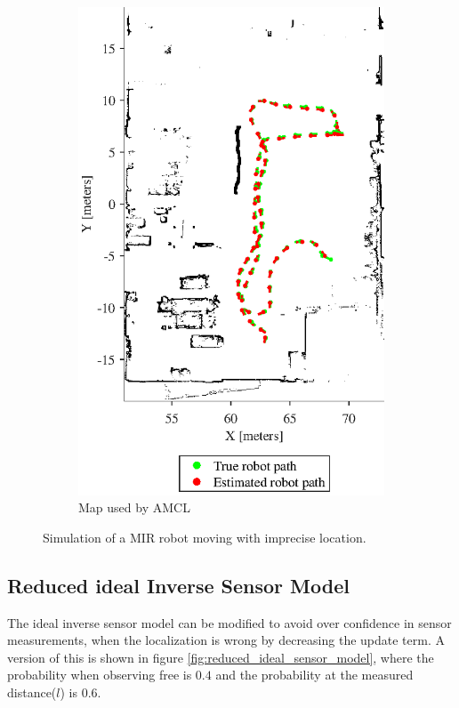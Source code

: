 \begin{figure}[htbp]
\begin{subfigure}[t]{0.45\textwidth}
		\label{fig:simulated_small_world}
	\end{subfigure}
	\begin{subfigure}[t]{0.45\textwidth}
		\includegraphics[width=\textwidth]{figures/static_mapping/simulation_poses_amcl_map}
		\caption{Map used by AMCL}
		\label{fig:simulated_small_amcl_map}
	\end{subfigure}
	\caption{Simulation of a MIR robot moving with imprecise location.}
	\label{fig:test_map_setup}
\end{figure}

\subsection{Reduced ideal Inverse Sensor Model}
\label{sec:reduced_ideal_sensor_model}
The ideal inverse sensor model can be modified to avoid over confidence in sensor measurements, when the localization is wrong by decreasing the update term. 
A version of this is shown in figure \vref{fig:reduced_ideal_sensor_model}, where the probability when observing free is $0.4$ and the probability at the measured distance($l$) is $0.6$. 

